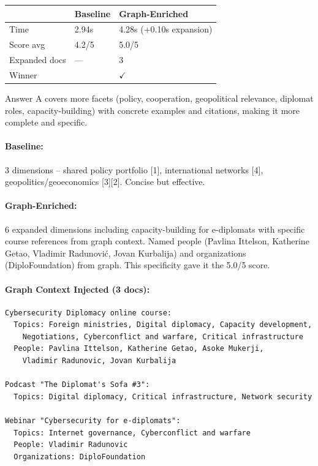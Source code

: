 \documentclass[11pt,a4paper]{article}
\newcommand{\winner}[1]{\textbf{\textcolor{graphwin}{#1}}}
\begin{document}
\begin{tabularx}{\textwidth}{lXX}
\toprule
& \textbf{Baseline} & \textbf{Graph-Enriched} \\
\midrule
Time & 2.94s & 4.28s (+0.10s expansion) \\
Score avg & 4.2/5 & 5.0/5 \\
Expanded docs & --- & 3 \\
Winner & & \winner{$\checkmark$} \\
\bottomrule
\end{tabularx}

\begin{tcolorbox}[colback=judgebox, colframe=orange!40!black, title=Judge Reasoning]
Answer A covers more facets (policy, cooperation, geopolitical relevance, diplomat roles, capacity-building) with concrete examples and citations, making it more complete and specific.
\end{tcolorbox}

\paragraph{Baseline:} 3 dimensions -- shared policy portfolio [1], international networks [4], geopolitics/geoeconomics [3][2]. Concise but effective.

\paragraph{Graph-Enriched:} 6 expanded dimensions including capacity-building for e-diplomats with specific course references from graph context. Named people (Pavlina Ittelson, Katherine Getao, Vladimir Radunović, Jovan Kurbalija) and organizations (DiploFoundation) from graph. This specificity gave it the 5.0/5 score.

\paragraph{Graph Context Injected (3 docs):}
\begin{lstlisting}
Cybersecurity Diplomacy online course:
  Topics: Foreign ministries, Digital diplomacy, Capacity development,
    Negotiations, Cyberconflict and warfare, Critical infrastructure
  People: Pavlina Ittelson, Katherine Getao, Asoke Mukerji,
    Vladimir Radunovic, Jovan Kurbalija

Podcast "The Diplomat's Sofa #3":
  Topics: Digital diplomacy, Critical infrastructure, Network security

Webinar "Cybersecurity for e-diplomats":
  Topics: Internet governance, Cyberconflict and warfare
  People: Vladimir Radunovic
  Organizations: DiploFoundation
\end{lstlisting}
\end{document}
